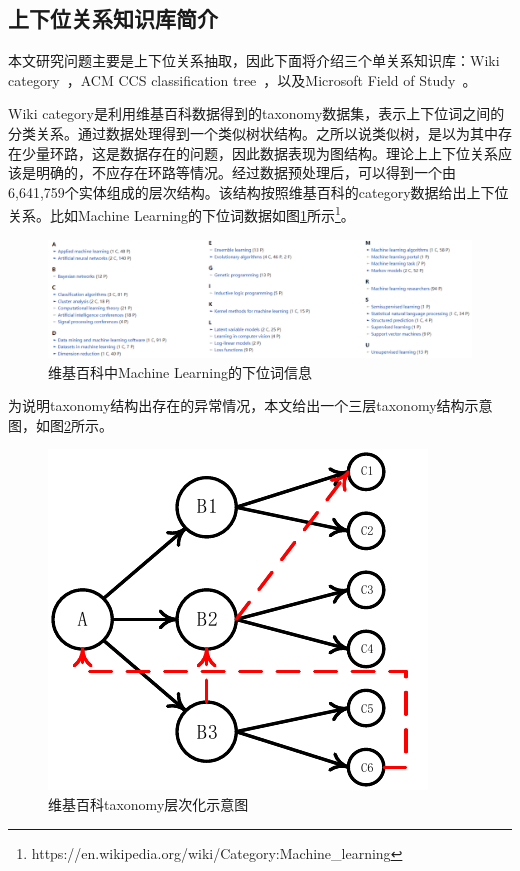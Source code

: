 \subsection{上下位关系知识库简介}
本文研究问题主要是上下位关系抽取，因此下面将介绍三个单关系知识库：Wiki category~，ACM CCS classification tree~，以及Microsoft Field of Study~。

Wiki category是利用维基百科数据得到的taxonomy数据集，表示上下位词之间的分类关系。通过数据处理得到一个类似树状结构。之所以说类似树，是以为其中存在少量环路，这是数据存在的问题，因此数据表现为图结构。理论上上下位关系应该是明确的，不应存在环路等情况。经过数据预处理后，可以得到一个由6,641,759个实体组成的层次结构。该结构按照维基百科的category数据给出上下位关系。比如Machine Learning的下位词数据如图\ref{fig:ml_cat}所示\footnote{https://en.wikipedia.org/wiki/Category:Machine\_learning}。
\begin{figure}
	\centering
	\includegraphics[width=.85\linewidth]{./figures/ml_cat.jpg}
	\caption{维基百科中Machine Learning的下位词信息}
	\label{fig:ml_cat}
\end{figure}

为说明taxonomy结构出存在的异常情况，本文给出一个三层taxonomy结构示意图，如图\ref{fig:category}所示。
\begin{figure}
	\centering
	\includegraphics[width=.65\linewidth]{./figures/category.pdf}
	\caption{维基百科taxonomy层次化示意图}
	\label{fig:category}
\end{figure}

